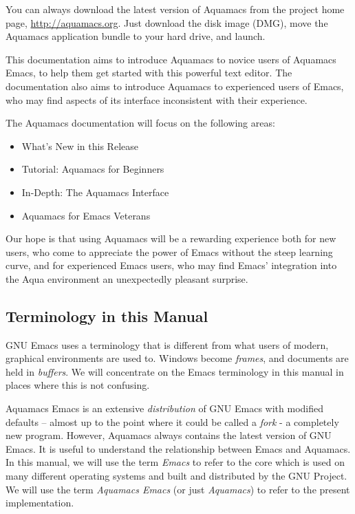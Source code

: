 \documentclass[11pt,letterpaper]{article}
\begin{document}
You can always download the latest version of Aquamacs from the project home page, \url{http://aquamacs.org}.  Just download the disk image (DMG), move the Aquamacs application bundle to your hard drive, and launch.


This documentation aims to introduce Aquamacs to novice users of Aquamacs Emacs, to help them get started with this powerful text editor. The documentation also aims to introduce Aquamacs to experienced users of Emacs, who may find aspects of its interface inconsistent with their experience.

The Aquamacs documentation will focus on the following areas:

\begin{itemize}
\item What's New in this Release
\item Tutorial: Aquamacs for Beginners
\item In-Depth: The Aquamacs Interface
\item Aquamacs for Emacs Veterans
\end{itemize}

Our hope is that using Aquamacs will be a rewarding experience both for new users, who come to appreciate the power of Emacs without the steep learning curve, and for experienced Emacs users, who may find Emacs' integration into the Aqua environment an unexpectedly pleasant surprise.

\subsection{Terminology in this Manual}

GNU Emacs uses a terminology that is different from what users of modern, graphical environments are used to. Windows become \emph{frames}, and documents are held in \emph{buffers}. We will concentrate on the Emacs terminology in this manual in places where this is not confusing.

Aquamacs Emacs is an extensive \emph{distribution} of GNU Emacs with modified defaults -- almost up to the point where it could be called a \emph{fork} - a completely new program. However, Aquamacs always contains the latest version of GNU Emacs. It is useful to understand the relationship between Emacs and Aquamacs. In this manual, we will use the term \emph{Emacs} to refer to the core which is used on many different operating systems and built and distributed by the GNU Project. We will use the term \emph{Aquamacs Emacs} (or just \emph{Aquamacs}) to refer to the present implementation.
\end{document}
